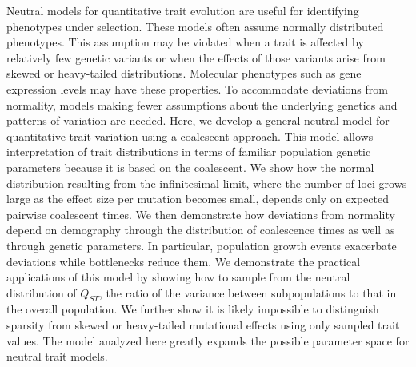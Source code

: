 Neutral models for quantitative trait evolution are useful for identifying
phenotypes under selection. These models often assume normally distributed
phenotypes. This assumption may be violated when a trait is affected by
relatively few genetic variants or when the effects of those variants arise from
skewed or heavy-tailed distributions. Molecular phenotypes such as gene
expression levels may have these properties. To accommodate deviations from
normality, models making fewer assumptions about the underlying genetics and
patterns of variation are needed. Here, we develop a general neutral model for
quantitative trait variation using a coalescent approach. This model allows
interpretation of trait distributions in terms of familiar population genetic
parameters because it is based on the coalescent. We show how the normal
distribution resulting from the infinitesimal limit, where the number of loci
grows large as the effect size per mutation becomes small, depends only on
expected pairwise coalescent times. We then demonstrate how deviations from
normality depend on demography through the distribution of coalescence times as
well as through genetic parameters. In particular, population growth events
exacerbate deviations while bottlenecks reduce them. We demonstrate the
practical applications of this model by showing how to sample from the neutral
distribution of $Q_{ST}$, the ratio of the variance between subpopulations to
that in the overall population. We further show it is likely impossible to
distinguish sparsity from skewed or heavy-tailed mutational effects using only
sampled trait values. The model analyzed here greatly expands the possible
parameter space for neutral trait models.

